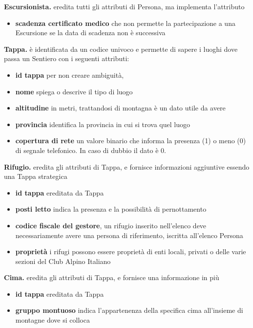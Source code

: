 \documentclass[10pt, a4paper]{article}
\begin{document}
\noindent \textbf{Escursionista.} eredita tutti gli attributi di Persona, ma implementa l'attributo
\begin{itemize}
    \item \textbf{scadenza certificato medico} che non permette la partecipazione a una Escursione se la data di scadenza non è successiva
\end{itemize}

\noindent \textbf{Tappa.} è identificata da un codice univoco e permette di sapere i luoghi dove passa un Sentiero con i seguenti attributi:
\begin{itemize}
    \item \textbf{id tappa} per non creare ambiguità,
    \item \textbf{nome} spiega o descrive il tipo di luogo
    \item \textbf{altitudine} in metri, trattandosi di montagna è un dato utile da avere
    \item \textbf{provincia} identifica la provincia in cui si trova quel luogo
    \item \textbf{copertura di rete} un valore binario che informa la presenza (1) o meno (0) di segnale telefonico. In caso di dubbio il dato è 0.
\end{itemize}

\noindent \textbf{Rifugio.} eredita gli attributi di Tappa, e fornisce informazioni aggiuntive essendo una Tappa strategica
\begin{itemize}
    \item \textbf{id tappa} ereditata da Tappa
    \item \textbf{posti letto} indica la presenza e la possibilità di pernottamento
    \item \textbf{codice fiscale del gestore}, un rifugio inserito nell'elenco deve necessariamente avere una persona di riferimento, iscritta all'elenco Persona
    \item \textbf{proprietà} i rifugi possono essere proprietà di enti locali, privati o delle varie sezioni del Club Alpino Italiano
\end{itemize}

\noindent \textbf{Cima.} eredita gli attributi di Tappa, e fornisce una informazione in più
\begin{itemize}
    \item \textbf{id tappa} ereditata da Tappa
    \item \textbf{gruppo montuoso} indica l'appartenenza della specifica cima all'insieme di montagne dove si colloca
\end{itemize}
\end{document}
